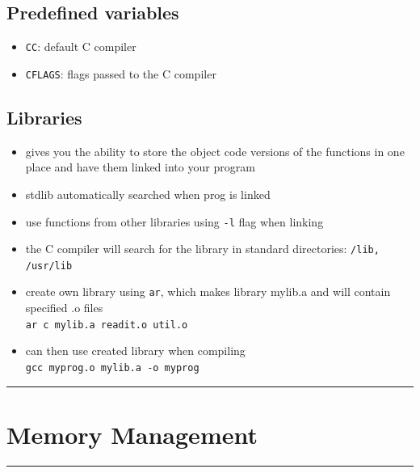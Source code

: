 \documentclass[10pt, multicolumn, a4paper]{article}
\begin{document}
\begin{multicols}{2}
	\subsection*{Predefined variables}
	\begin{itemize}
	\item \verb|CC|: default C compiler
	\item \verb|CFLAGS|: flags passed to the C compiler
	\end{itemize}
	\subsection*{Libraries}
	\begin{itemize}
	\item gives you the ability to store the object code versions of the functions in one place and have them linked into your program
	\item stdlib automatically searched when prog is linked
	\item use functions from other libraries using \verb|-l| flag when linking
	\item the C compiler will search for the library in standard directories: \verb|/lib, /usr/lib|
	\item create own library using \verb|ar|, which makes library mylib.a and will contain specified .o files
		\\ \verb|ar c mylib.a readit.o util.o|
	\item can then use created library when compiling
		\\ \verb|gcc myprog.o mylib.a -o myprog|
	\end{itemize}
\end{multicols}


\hrule
\section{Memory Management}
\hrule 
\end{document}
